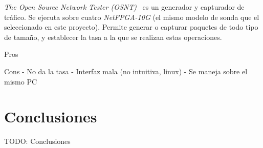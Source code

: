 \textit{The Open Source Network Tester (OSNT)}~\cite{osnt} es un generador y capturador de tráfico.
Se ejecuta sobre cuatro \textit{NetFPGA-10G} (el mismo modelo de sonda que el seleccionado en este proyecto).
Permite generar o capturar paquetes de todo tipo de tamaño, y establecer la tasa a la que se realizan estas operaciones.

Pros

Cons
- No da la tasa
- Interfaz mala (no intuitiva, linux)
- Se maneja sobre el mismo PC

\section{Conclusiones\label{sec:eda:conclusiones}}

TODO: Conclusiones
